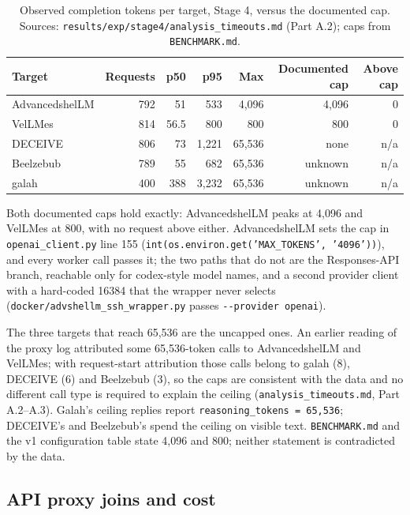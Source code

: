 \documentclass[a4paper,11pt]{article}
\begin{document}
\begin{table}[ht]
\centering
\caption{Observed completion tokens per target, Stage 4, versus the documented
cap. Sources: \texttt{results/exp/stage4/analysis\_timeouts.md} (Part A.2);
caps from \texttt{BENCHMARK.md}.}
\label{tab:maxtokens}
\scriptsize
\begin{tabular}{l r r r r r r}
\toprule
Target & Requests & p50 & p95 & Max & Documented cap & Above cap \\
\midrule
AdvancedshelLM & 792 & 51 & 533 & 4,096 & 4,096 & 0 \\
VelLMes & 814 & 56.5 & 800 & 800 & 800 & 0 \\
DECEIVE & 806 & 73 & 1,221 & 65,536 & none & n/a \\
Beelzebub & 789 & 55 & 682 & 65,536 & unknown & n/a \\
galah & 400 & 388 & 3,232 & 65,536 & unknown & n/a \\
\bottomrule
\end{tabular}
\end{table}

Both documented caps hold exactly: AdvancedshelLM peaks at 4,096 and VelLMes at
800, with no request above either. AdvancedshelLM sets the cap in
\texttt{openai\_client.py} line 155 (\texttt{int(os.environ.get('MAX\_TOKENS',
'4096'))}), and every worker call passes it; the two paths that do not are the
Responses-API branch, reachable only for codex-style model names, and a
second provider client with a hard-coded 16384 that the wrapper never selects
(\texttt{docker/advshellm\_ssh\_wrapper.py} passes \texttt{-{}-provider openai}).

The three targets that reach 65,536 are the uncapped ones. An earlier reading
of the proxy log attributed some 65,536-token calls to AdvancedshelLM and
VelLMes; with request-start attribution those calls belong to galah (8),
DECEIVE (6) and Beelzebub (3), so the caps are consistent with the data and no
different call type is required to explain the ceiling
(\texttt{analysis\_timeouts.md}, Part A.2--A.3). Galah's ceiling replies report
\texttt{reasoning\_tokens = 65,536}; DECEIVE's and Beelzebub's spend the ceiling
on visible text. \texttt{BENCHMARK.md} and the v1 configuration table state
4,096 and 800; neither statement is contradicted by the data.

\subsection{API proxy joins and cost}
\label{sec:s4-cost}
\end{document}
